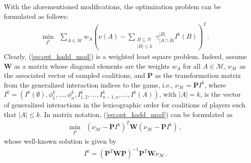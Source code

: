 With the aforementioned modifications, the optimization problem can be formulated as follows:
\begin{equation}
\label{eq:opt_kadd_mod}
\begin{array}{rl}
\displaystyle\min_{I^k} & \sum\limits_{A \in \mathcal{M}} w_{A}\left( \nu(A) - \sum\limits_{\substack{B \subseteq N \\ |B| \leq k}} \gamma^{\left|B \right|}_{\left| A \cap B \right|} I^k(B) \right)^2 \, .
\end{array}
\end{equation}
Clearly, (\ref{eq:opt_kadd_mod}) is a weighted least square problem. Indeed, assume $\mathbf{W}$ as a matrix whose diagonal elements are the weights $w_A$ for all $A \in \mathcal{M}$, $\nu_{\mathcal{M}}$ as the associated vector of sampled coalitions, and $\mathbf{P}$ as the transformation matrix from the generalized interaction indices to the game, i.e., $\nu_{\mathcal{M}} = \mathbf{P} I^k$,
where $I^k = (I^k(\emptyset), \phi_1^k, \ldots, \phi_n^k, I_{1,2}^k, \ldots, I_{n-1,n}^k, \ldots, I^k(A))$, with $\left| A \right| = k$, is the vector of generalized interactions in the lexicographic order for coalitions of players such that $\left| A \right| \leq k$.
In matrix notation, (\ref{eq:opt_kadd_mod}) can be formulated as
\begin{equation}
\label{eq:opt_kadd_ls}
\begin{array}{rl}
\displaystyle\min_{I^k} & \left( \nu_{\mathcal{M}} - \mathbf{P} I^k \right)^T \mathbf{W} \left( \nu_{\mathcal{M}} - \mathbf{P} I^k \right) \, ,
\end{array}
\end{equation}
whose well-known solution is given by
\begin{equation}
\begin{array}{rl}
I^k = \left( \mathbf{P}^T\mathbf{W}\mathbf{P} \right)^{-1} \mathbf{P}^T\mathbf{W} \nu_{\mathcal{M}} \, .
\end{array}
\end{equation}